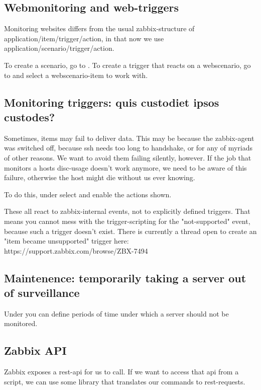 \subsection{Webmonitoring and web-triggers}
Monitoring websites differs from the usual zabbix-structure of application/item/trigger/action, in that now we use application/scenario/trigger/action.

To create a scenario, go to . To create a trigger that reacts on a webscenario, go to  and select a webscenario-item to work with.



\subsection{Monitoring triggers: quis custodiet ipsos custodes?}
Sometimes, items may fail to deliver data. This may be because the zabbix-agent was switched off, because ssh needs too long to handshake, or for any of myriads of other reasons. We want to avoid them failing silently, however. If the job that monitors a hosts disc-usage doesn't work anymore, we need to be aware of this failure, otherwise the host might die without us ever knowing. 

To do this, under  select  and enable the actions shown.

These all react to zabbix-internal events, not to explicitly defined triggers. That means you cannot mess with the trigger-scripting for the "not-supported" event, because such a trigger doesn't exist. There is currently a thread open to create an "item became unsupported" trigger here: https://support.zabbix.com/browse/ZBX-7494



\subsection{Maintenence: temporarily taking a server out of surveillance}
Under  you can define periods of time under which a server should not be monitored. 




\subsection{Zabbix API}
Zabbix exposes a rest-api for us to call. If we want to access that api from a script, we can use some library that translates our commands to rest-requests. 

